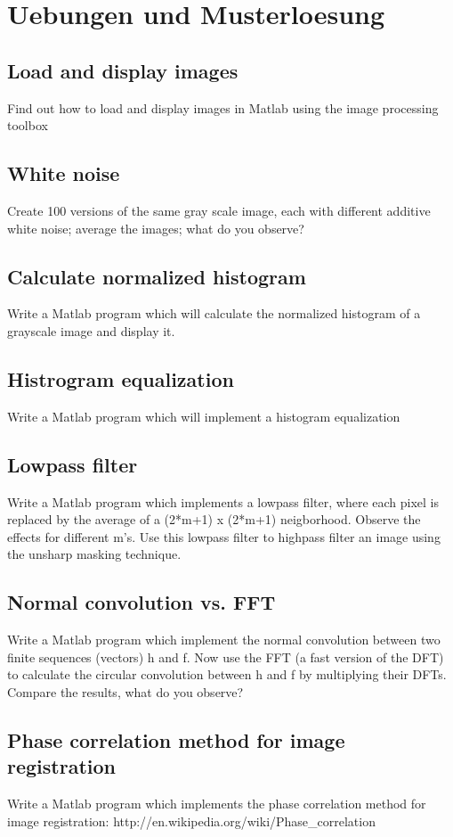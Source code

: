 \section{Uebungen und Musterloesung}

\subsection{Load and display images}
Find out how to load and display images in Matlab using the image processing
toolbox
\subsection{White noise}
Create 100 versions of the same gray scale image, each with different additive
white noise; average the images; what do you observe?
\subsection{Calculate normalized histogram}
Write a Matlab program which will calculate the normalized histogram of a
grayscale image and display it. 
\subsection{Histrogram equalization}
Write a Matlab program which will implement a histogram equalization
\subsection{Lowpass filter}
Write a Matlab program which implements a lowpass filter, where each pixel is
replaced by the average of a (2*m+1) x (2*m+1) neigborhood. Observe the effects for different m's. Use this lowpass filter to highpass filter an image using the unsharp masking technique. 
\subsection{Normal convolution vs. FFT}
Write a Matlab program which implement the normal convolution between two finite
sequences (vectors) h and f. Now use the FFT (a fast version of the DFT) to calculate the circular convolution between h and f by multiplying their DFTs. Compare the results, what do you observe?
\subsection{Phase correlation method for image registration}
Write a Matlab program which implements the phase correlation method for image
registration: http://en.wikipedia.org/wiki/Phase\_correlation
